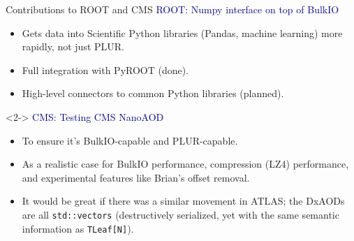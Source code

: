 \documentclass{beamer}
\begin{document}
\begin{frame}{Contributions to ROOT and CMS}
\vspace{0.5 cm}
\textcolor{darkblue}{ROOT: Numpy interface on top of BulkIO}
\begin{itemize}
\item Gets data into Scientific Python libraries (Pandas, machine learning) more rapidly, not just PLUR.
\item Full integration with PyROOT (done).
\item High-level connectors to common Python libraries (planned).
\end{itemize}

\vspace{0.5 cm}
\begin{uncoverenv}<2->
\textcolor{darkblue}{CMS: Testing CMS NanoAOD}
\begin{itemize}
\item To ensure it's BulkIO-capable and PLUR-capable.
\item As a realistic case for BulkIO performance, compression (LZ4) performance, and experimental features like Brian's offset removal.
\item It would be great if there was a similar movement in ATLAS; the DxAODs are all {\tt\small std::vectors} (destructively serialized, yet with the same semantic information as {\tt\small TLeaf[N]}).
\end{itemize}
\end{uncoverenv}
\end{frame}
\end{document}
